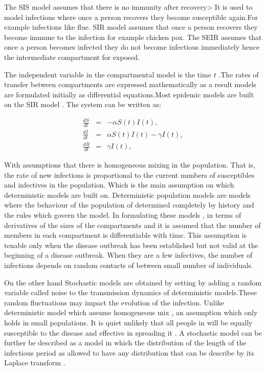 The SIS model assumes that there is no immunity after recovery> It is used to model infections where once a person recovers they become susceptible again.For example infections like flue. SIR model assumes that once a person recovers they become immune to the infection for example chicken pox. The SEIR assumes that once a person  becomes infected they do not  become infectious immediately hence the intermediate compartment for exposed. 

The independent variable in the compartmental model is the time $t$ .The rates of transfer between compartments are expressed mathematically as a result models are formulated initially as differential equations.Most epidemic models are built on the SIR model  \citep{m1925applications}. The system can be written as;


\begin{center}
\begin{equation} \label{eqn1_1}
\begin{array}{ccl}
\frac{dS}{dt} &= &-\alpha S(t) I(t),\\
 \frac{dI}{dt} &=& \alpha S(t) I(t) - \gamma  I(t), \\
 \frac{dR}{dt} &= &\gamma  I(t),
\end{array}  
\end{equation}
\end{center}

 With assumptions that there is homogeneous mixing in the population. That is, the rate of new infections is proportional to the current numbers of susceptibles and infectives in the population. Which is the main assumption on which deterministic models are built on. Deterministic population  models are models where the behaviour of the population of determined completely by history and the rules which govern the model. In formulating these models , in terms of derivatives of the sizes of the compartments and it is assumed that the number of members in each compartment is differentiable with time. This assumption is tenable only when the disease outbreak has been established  but not valid at the beginning of a disease outbreak. When they are a few infectives, the number of infections depends on random contacts of between small number of individuals.
 
 On the other hand Stochastic models are obtained by setting by adding a random variable called noise to the transmission dynamics of deterministic models.These random fluctuations may impact the evolution of the infection. Unlike deterministic model which assume homogeneous mix , an assumption which only holds in small populations. It is quiet unlikely that all people in will be equally susceptible to the disease and effective in spreading it \citep{ball1985deterministic}. A stochastic model can be further be described as a model in which the distribution of the length of the infectious period as allowed to have any distribution that can be describe by its Laplace transform \citep{addy1991generalized}.
 
